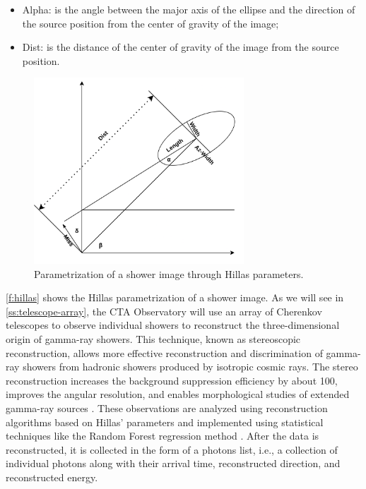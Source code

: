 \begin{itemize}
    \item Alpha: is the angle between the major axis of the ellipse and the direction of the source position from the center of gravity of the image;
    \item Dist: is the distance of the center of gravity of the image from the source position.
\end{itemize}
\begin{figure}[ht] 
\centering
\includegraphics[width=0.7\textwidth]{figures/introduction/hillas.png}
\caption{Parametrization of a shower image through Hillas parameters.}
\label{f:hillas}
\end{figure}
\autoref{f:hillas} shows the Hillas parametrization of a shower image.
As we will see in \autoref{ss:telescope-array}, the CTA Observatory will use an array of Cherenkov telescopes to observe individual showers to reconstruct the three-dimensional origin of gamma-ray showers. This technique, known as stereoscopic reconstruction, allows more effective reconstruction and discrimination of gamma-ray showers from hadronic showers produced by isotropic cosmic rays. The stereo reconstruction increases the background suppression efficiency by about 100, improves the angular resolution, and enables morphological studies of extended gamma-ray sources \cite{Spurio2018}.
These observations are analyzed using reconstruction algorithms based on Hillas’ parameters and implemented using statistical techniques like the Random Forest regression method \cite{Albert2008}. After the data is reconstructed, it is collected in the form of a photons list, i.e., a collection of individual photons along with their arrival time, reconstructed direction, and reconstructed energy. 

